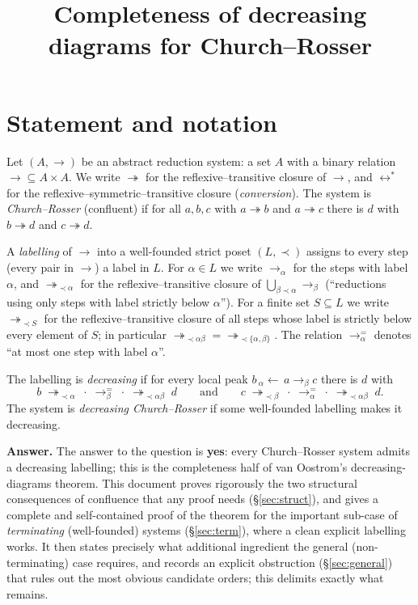\documentclass{amsart}
\theoremstyle{definition}
\theoremstyle{remark}
\newcommand{\redto}{\rightarrow}
\newcommand{\redtt}{\twoheadrightarrow}
\newcommand{\conv}{\leftrightarrow^{*}}
\begin{document}
\title{Completeness of decreasing diagrams for Church--Rosser}
\maketitle

\section{Statement and notation}

Let $(A,\redto)$ be an abstract reduction system: a set $A$ with a binary
relation ${\redto}\subseteq A\times A$.  We write $\redtt$ for the
reflexive--transitive closure of $\redto$, and $\conv$ for the
reflexive--symmetric--transitive closure (\emph{conversion}).  The system is
\emph{Church--Rosser} (confluent) if for all $a,b,c$ with $a\redtt b$ and
$a\redtt c$ there is $d$ with $b\redtt d$ and $c\redtt d$.

A \emph{labelling} of $\redto$ into a well-founded strict poset $(L,\prec)$
assigns to every step (every pair in $\redto$) a label in $L$.  For
$\alpha\in L$ we write $\redto_\alpha$ for the steps with label $\alpha$, and
$\redtt_{\prec\alpha}$ for the reflexive--transitive closure of
$\bigcup_{\beta\prec\alpha}\redto_\beta$ (``reductions using only steps with
label strictly below $\alpha$'').  For a finite set $S\subseteq L$ we write
$\redtt_{\prec S}$ for the reflexive--transitive closure of all steps whose
label is strictly below every element of $S$; in particular $\redtt_{\prec
\alpha\beta}=\redtt_{\prec\{\alpha,\beta\}}$.  The relation $\redto^{=}_\alpha$
denotes ``at most one step with label $\alpha$''.

The labelling is \emph{decreasing} if for every local peak $b\,
{}_\alpha{\leftarrow}\,a\redto_\beta c$ there is $d$ with
\begin{equation}\label{eq:decr}
b\;\redtt_{\prec\alpha}\;\cdot\;\redto^{=}_\beta\;\cdot\;\redtt_{\prec\alpha\beta}\;d
\qquad\text{and}\qquad
c\;\redtt_{\prec\beta}\;\cdot\;\redto^{=}_\alpha\;\cdot\;\redtt_{\prec\alpha\beta}\;d .
\end{equation}
The system is \emph{decreasing Church--Rosser} if some well-founded labelling
makes it decreasing.

\medskip
\noindent\textbf{Answer.}  The answer to the question is \textbf{yes}: every
Church--Rosser system admits a decreasing labelling; this is the completeness
half of van Oostrom's decreasing-diagrams theorem.  This document proves
rigorously the two structural consequences of confluence that any proof needs
(\S\ref{sec:struct}), and gives a complete and self-contained proof of the
theorem for the important sub-case of \emph{terminating} (well-founded) systems
(\S\ref{sec:term}), where a clean explicit labelling works.  It then states
precisely what additional ingredient the general (non-terminating) case
requires, and records an explicit obstruction (\S\ref{sec:general}) that rules
out the most obvious candidate orders; this delimits exactly what remains.
\end{document}
